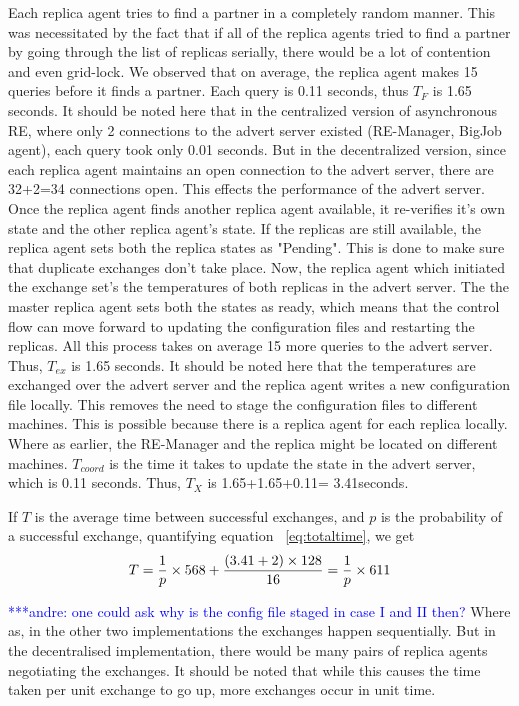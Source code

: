 \documentclass{rspublic}
\newcommand{\alnote}[1]{ {\textcolor{blue} { ***andre: #1 }}}
\newcommand{\alnote}[1]{}
\begin{document}
Each replica agent tries to find a partner in a completely random
manner. This was necessitated by the fact that if all of the replica
agents tried to find a partner by going through the list of replicas
serially, there would be a lot of contention and even grid-lock. We
observed that on average, the replica agent makes 15 queries before it
finds a partner. Each query is 0.11 seconds, thus $T_F$ is 1.65
seconds. It should be noted here that in the centralized version of
asynchronous RE, where only 2 connections to the advert server existed
(RE-Manager, BigJob agent), each query took only 0.01 seconds. But in
the decentralized version, since each replica agent maintains an open
connection to the advert server, there are 32+2=34 connections
open. This effects the performance of the advert server. Once the
replica agent finds another replica agent available, it re-verifies
it's own state and the other replica agent's state. If the replicas
are still available, the replica agent sets both the replica states as
"Pending". This is done to make sure that duplicate exchanges don't
take place. Now, the replica agent which initiated the exchange set's
the temperatures of both replicas in the advert server. The the master
replica agent sets both the states as ready, which means that the
control flow can move forward to updating the configuration files and
restarting the replicas. All this process takes on average 15 more
queries to the advert server. Thus, $T_{ex}$ is 1.65 seconds. It
should be noted here that the temperatures are exchanged over the
advert server and the replica agent writes a new configuration file
locally. This removes the need to stage the configuration files to
different machines. This is possible because there is a replica agent
for each replica locally. Where as earlier, the RE-Manager and the
replica might be located on different machines. $T_{coord}$ is the
time it takes to update the state in the advert server, which is 0.11
seconds. Thus, $T_X$ is 1.65+1.65+0.11= 3.41seconds.

If $T$ is the average time between successful exchanges, and $p$ is
the probability of a successful exchange, quantifying equation
~\ref{eq:totaltime}, we get
\begin{eqnarray}
T=  {1 \over p} \times {568 + {(3.41+2)\times 128\over 16}} = {1 \over p} \times 611
\label{eq:timebt}
\end{eqnarray}


\alnote {one could ask why is the config file staged in case I and II
  then?}  Where as, in the other two implementations the exchanges
happen sequentially. But in the decentralised implementation, there
would be many pairs of replica agents negotiating the exchanges. It
should be noted that while this causes the time taken per unit
exchange to go up, more exchanges occur in unit time.
\end{document}
